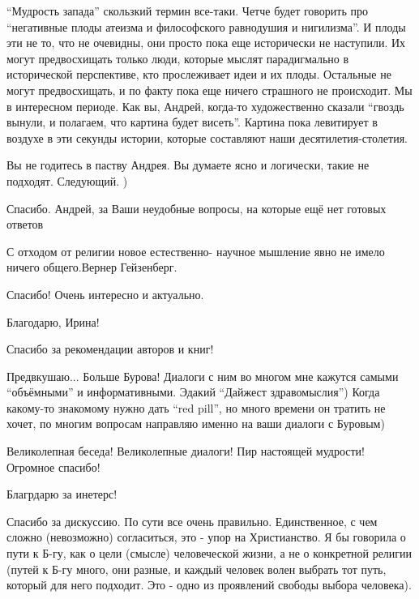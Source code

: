 \begin{multicols}{2}

\enquote{Мудрость запада} скользкий термин все-таки. Четче будет говорить про
\enquote{негативные плоды атеизма и философского равнодушия и нигилизма}. И плоды эти
не то, что не очевидны, они просто пока еще исторически не наступили. Их могут
предвосхищать только люди, которые мыслят парадигмально в исторической
перспективе, кто прослеживает идеи и их плоды. Остальные не могут
предвосхищать, и по факту пока еще ничего страшного не происходит. Мы в
интересном периоде. Как вы, Андрей, когда-то художественно сказали \enquote{гвоздь
вынули, и полагаем, что картина будет висеть}. Картина пока левитирует в
воздухе в эти секунды истории, которые составляют наши десятилетия-столетия.

Вы не годитесь в паству Андрея. Вы думаете ясно и логически, такие не подходят. Следующий. )


Спасибо. Андрей,
за Ваши неудобные вопросы, на которые ещё нет готовых ответов


С отходом от религии новое естественно- научное мышление явно  не имело ничего
общего.Вернер Гейзенберг.


Спасибо! Очень интересно и актуально.

Благодарю, Ирина!

Спасибо за рекомендации авторов и книг!


Предвкушаю...
Больше Бурова! Диалоги с ним во многом мне кажутся самыми \enquote{объёмными} и информативными.
Эдакий \enquote{Дайжест здравомыслия})
Когда какому-то знакомому нужно дать \enquote{red pill}, но много времени он тратить не хочет, по многим вопросам направляю именно на ваши диалоги с Буровым)

Великолепная беседа! Великолепные диалоги! Пир настоящей мудрости! Огромное спасибо!

Благрдарю за инетерс!


Спасибо за дискуссию. По сути все очень правильно. Единственное, с чем сложно
(невозможно) согласиться, это - упор на Христианство. Я бы говорила о пути к
Б-гу, как о цели (смысле) человеческой жизни, а не о конкретной религии (путей
к Б-гу много, они разные, и каждый человек волен выбрать тот путь, который для
него подходит. Это - одно из проявлений свободы выбора человека).


\end{multicols}
